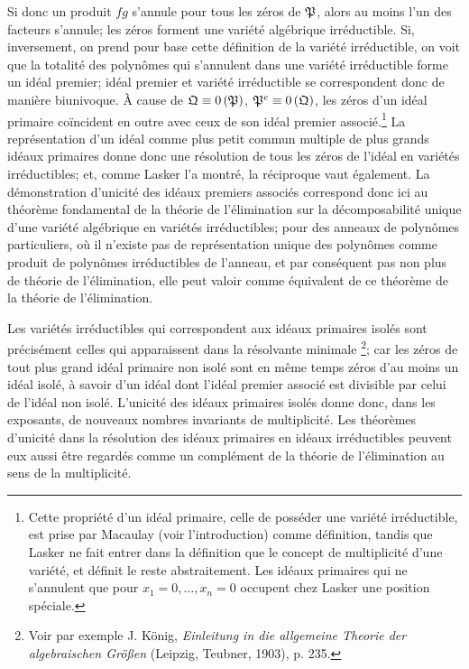 Si donc un produit $fg$ s'annule pour tous les zéros de $\mathfrak{P}$, alors au moins l'un des facteurs s'annule; les zéros forment une variété algébrique irréductible. Si, inversement, on prend pour base cette définition de la variété irréductible, on voit que la totalité des polynômes qui s'annulent dans une variété irréductible forme un idéal premier; idéal premier et variété irréductible se correspondent donc de manière biunivoque. À cause de $\mathfrak{Q}\equiv 0\,(\mathfrak{P})$, $\mathfrak{P}^e\equiv 0\,(\mathfrak{Q})$, les zéros d'un idéal primaire coïncident en outre avec ceux de son idéal premier associé.\footnote{Cette propriété d'un idéal primaire, celle de posséder une variété irréductible, est prise par Macaulay (voir l'introduction) comme définition, tandis que Lasker ne fait entrer dans la définition que le concept de multiplicité d'une variété, et définit le reste abstraitement. Les idéaux primaires qui ne s'annulent que pour $x_1=0,
\ldots,x_n=0$ occupent chez Lasker une position spéciale.} La représentation d'un idéal comme plus petit commun multiple de plus grands idéaux primaires donne donc une résolution de tous les zéros de l'idéal en variétés irréductibles; et, comme Lasker l'a montré, la réciproque vaut également. La démonstration d'unicité des idéaux premiers associés correspond donc ici au théorème fondamental de la théorie de l'élimination sur la décomposabilité unique d'une variété algébrique en variétés irréductibles; pour des anneaux de polynômes particuliers, où il n'existe pas de représentation unique des polynômes comme produit de polynômes irréductibles de l'anneau, et par conséquent pas non plus de théorie de l'élimination, elle peut valoir comme équivalent de ce théorème de la théorie de l'élimination.

Les variétés irréductibles qui correspondent aux idéaux primaires isolés sont précisément celles qui apparaissent dans la \og résolvante minimale \fg{}\footnote{Voir par exemple J. König, \emph{Einleitung in die allgemeine Theorie der algebraischen Größen} (Leipzig, Teubner, 1903), p. 235.}; car les zéros de tout plus grand idéal primaire non isolé sont en même temps zéros d'au moins un idéal isolé, à savoir d'un idéal dont l'idéal premier associé est divisible par celui de l'idéal non isolé. L'unicité des idéaux primaires isolés donne donc, dans les exposants, de nouveaux nombres invariants de multiplicité. Les théorèmes d'unicité dans la résolution des idéaux primaires en idéaux irréductibles peuvent eux aussi être regardés comme un complément de la théorie de l'élimination au sens de la multiplicité.

